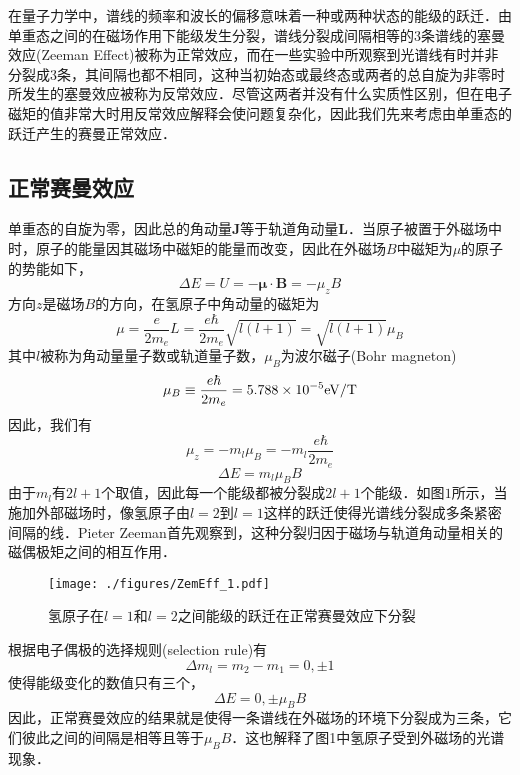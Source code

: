 

在量子力学中，谱线的频率和波长的偏移意味着一种或两种状态的能级的跃迁．由单重态之间的在磁场作用下能级发生分裂，谱线分裂成间隔相等的3条谱线的塞曼效应(Zeeman Effect)被称为正常效应，而在一些实验中所观察到光谱线有时并非分裂成3条，其间隔也都不相同，这种当初始态或最终态或两者的总自旋为非零时所发生的塞曼效应被称为反常效应．尽管这两者并没有什么实质性区别，但在电子磁矩的值非常大时用反常效应解释会使问题复杂化，因此我们先来考虑由单重态的跃迁产生的赛曼正常效应．

\subsection{正常赛曼效应}
单重态的自旋为零，因此总的角动量$\mathbf{J}$等于轨道角动量$\mathbf{L}$．当原子被置于外磁场中时，原子的能量因其磁场中磁矩的能量而改变，因此在外磁场$B$中磁矩为$\mu$的原子的势能如下，
$$\Delta E=U = -\boldsymbol\mu\cdot \mathbf{B}=-\mu_z B$$方向$z$是磁场$B$的方向，在氢原子中角动量的磁矩为$$\mu=\frac{e}{2m_e}L=\frac{e\hbar}{2m_e}\sqrt{l(l+1)}=\sqrt{l(l+1)}\mu_B$$
其中$l$被称为角动量量子数或轨道量子数，$\mu_B$为波尔磁子(Bohr magneton)
$$\mu_B\equiv\frac{e\hbar}{2m_e}=5.788\times 10^{-5}\rm{eV/T}$$
因此，我们有$$\mu_z=-m_l\mu_B=-m_l\frac{e\hbar}{2m_e}$$
\begin{equation}
\boxed{\Delta E = m_l\mu_B B}
\end{equation}
由于$m_l$有$2l+1$个取值，因此每一个能级都被分裂成$2l+1$个能级．如图$1$所示，当施加外部磁场时，像氢原子由$l=2$到$l=1$这样的跃迁使得光谱线分裂成多条紧密间隔的线．Pieter Zeeman首先观察到，这种分裂归因于磁场与轨道角动量相关的磁偶极矩之间的相互作用．
\begin{figure}[ht]
\centering
\texttt{[image: ./figures/ZemEff\_1.pdf]}
\caption{氢原子在$l=1$和$l=2$之间能级的跃迁在正常赛曼效应下分裂} \label{ZemEff_fig1}
\end{figure}
根据电子偶极的选择规则(selection rule)有
$$
\Delta m_l = m_2-m_1=0,\pm 1
$$
使得能级变化的数值只有三个，
$$
\Delta E = 0,\pm \mu_B B
$$
因此，正常赛曼效应的结果就是使得一条谱线在外磁场的环境下分裂成为三条，它们彼此之间的间隔是相等且等于$\mu_B B$．这也解释了图1中氢原子受到外磁场的光谱现象．
